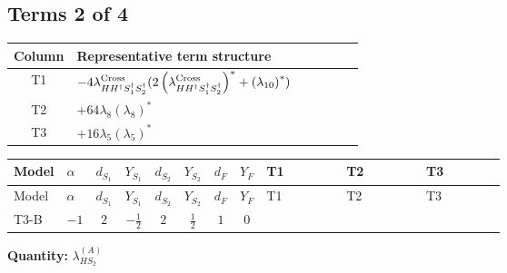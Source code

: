 \documentclass[8pt]{article}
\begin{document}
\begin{landscape}
\subsection*{Terms 2 of 4}
\begin{center}
\begin{tabular}{@{}c >{\raggedright\arraybackslash}p{0.82\linewidth}@{}}
\toprule
Column & Representative term structure \\
\midrule
T1 & \(\displaystyle -4 {\lambda_{H H^\dagger S_1^\dagger S_2^\dagger}^{\rm Cross}} (2 \left({\lambda_{H H^\dagger S_1^\dagger S_2^\dagger}^{\rm Cross}}\right)^{*}+\left({\lambda_{10}}\right)^{*})\) \\
\midrule
T2 & \(\displaystyle +64 {\lambda_{8}} \left({\lambda_{8}}\right)^{*}\) \\
\midrule
T3 & \(\displaystyle +16 {\lambda_5} \left({\lambda_5}\right)^{*}\) \\
\midrule
\bottomrule
\end{tabular}
\end{center}
\smallskip
\tiny
\begin{longtable}{@{}llcccccc >{\raggedright\arraybackslash}p{0.21\linewidth} >{\raggedright\arraybackslash}p{0.21\linewidth} >{\raggedright\arraybackslash}p{0.21\linewidth}@{}}
\toprule
Model & $\alpha$ & $d_{S_1}$ & $Y_{S_1}$ & $d_{S_2}$ & $Y_{S_2}$ & $d_F$ & $Y_F$ & T1 & T2 & T3 \\
\midrule
\endfirsthead
\toprule
Model & $\alpha$ & $d_{S_1}$ & $Y_{S_1}$ & $d_{S_2}$ & $Y_{S_2}$ & $d_F$ & $Y_F$ & T1 & T2 & T3 \\
\midrule
\endhead
T3-B & $-1$ & $2$ & $-\frac{1}{2}$ & $2$ & $\frac{1}{2}$ & $1$ & $0$ & \scriptsize\adjustbox{max width=\linewidth}{$\begin{gathered} -4 {\lambda_{H H^\dagger S_1^\dagger S_2^\dagger}^{\rm Cross}} (2 \left({\lambda_{H H^\dagger S_1^\dagger S_2^\dagger}^{\rm Cross}}\right)^{*}+\left({\lambda_{10}}\right)^{*})\end{gathered}$} & \scriptsize\adjustbox{max width=\linewidth}{$\begin{gathered} +64 {\lambda_{8}} \left({\lambda_{8}}\right)^{*}\end{gathered}$} & \scriptsize\adjustbox{max width=\linewidth}{$\begin{gathered} +16 {\lambda_5} \left({\lambda_5}\right)^{*}\end{gathered}$} \\
\midrule
\bottomrule
\end{longtable}
\clearpage
\noindent\textbf{Quantity: }$\lambda_{HS_2}^{(A)}$\par\smallskip

\end{landscape}
\end{document}
